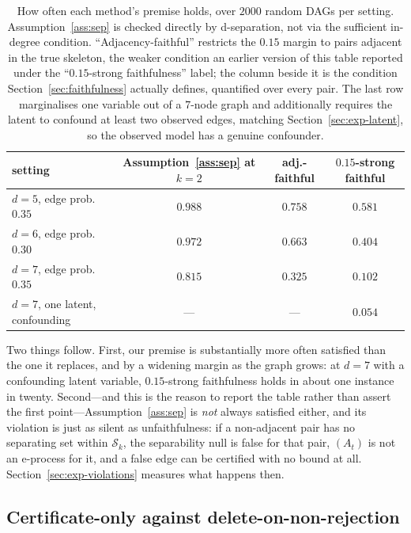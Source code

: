 \documentclass[pdflatex,sn-apa]{sn-jnl}
\theoremstyle{thmstyleone}%
\theoremstyle{thmstyletwo}%
\theoremstyle{thmstylethree}%
\newcommand{\Scal}{\mathcal{S}}
\begin{document}
\begin{table}[t]
\centering
\caption{How often each method's premise holds, over $2000$ random DAGs per
setting. Assumption~\ref{ass:sep} is checked directly by d-separation, not via
the sufficient in-degree condition. ``Adjacency-faithful'' restricts the
$0.15$ margin to pairs adjacent in the true skeleton, the weaker condition an
earlier version of this table reported under the ``$0.15$-strong
faithfulness'' label; the column beside it is the condition
Section~\ref{sec:faithfulness} actually defines, quantified over every pair.
The last row marginalises one variable out of a $7$-node graph and additionally
requires the latent to confound at least two observed edges, matching
Section~\ref{sec:exp-latent}, so the observed model has a genuine
confounder.}\label{tab:premises}
\footnotesize
\begin{tabular}{@{}lccc@{}}
\toprule
setting & Assumption~\ref{ass:sep} at $k=2$ & adj.-faithful &
$0.15$-strong faithful \\
\midrule
$d=5$, edge prob.\ $0.35$      & $0.988$ & $0.758$ & $0.581$ \\
$d=6$, edge prob.\ $0.30$      & $0.972$ & $0.663$ & $0.404$ \\
$d=7$, edge prob.\ $0.35$      & $0.815$ & $0.325$ & $0.102$ \\
$d=7$, one latent, confounding & ---     & ---     & $0.054$ \\
\bottomrule
\end{tabular}
\end{table}

Two things follow. First, our premise is substantially more often satisfied
than the one it replaces, and by a widening margin as the graph grows: at
$d = 7$ with a confounding latent variable, $0.15$-strong faithfulness holds in
about one instance in twenty. Second---and this is the reason to report the
table rather than assert the first point---Assumption~\ref{ass:sep} is
\emph{not} always satisfied either, and its violation is just as silent as
unfaithfulness: if a non-adjacent pair has no separating set within $\Scal_k$,
the separability null is false for that pair, $(A_t)$ is not an e-process for
it, and a false edge can be certified with no bound at all.
Section~\ref{sec:exp-violations} measures what happens then.

\subsection{Certificate-only against delete-on-non-rejection}
\label{sec:exp-main}
\end{document}
